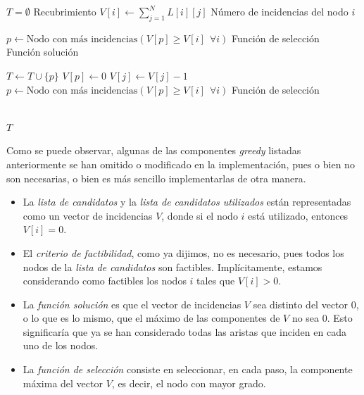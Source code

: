 \documentclass[11pt]{article}
\begin{document}
\begin{algorithm}
\begin{algorithmic}


    \State $T = \emptyset$ \Comment Recubrimiento
        \State $\displaystyle V[i] \gets \sum_{j=1}^N L[i][j]$ \Comment Número de incidencias del nodo $i$
    \EndFor

    \State $p \gets \text{Nodo con más incidencias} \left( V[p] \ge V[i] \ \ \forall i \right)$ \Comment Función de selección \\

     \Comment Función solución

        \State $T \gets T \cup \{p\}$
        \State $V[p] \gets 0$
                \State $V[j] \gets V[j]-1$
            \EndIf
        \EndFor
        \State $p \gets \text{Nodo con más incidencias} \left( V[p] \ge V[i] \ \ \forall i \right)$ \Comment Función de selección

    \EndWhile \\
    \State \Return $T$
\EndFunction
\end{algorithmic}
\end{algorithm}

Como se puede observar, algunas de las componentes \textit{greedy} listadas anteriormente se han omitido o modificado en la implementación, pues o bien no son necesarias, o bien es más sencillo implementarlas de otra manera.

\begin{itemize}
	\item La \textit{lista de candidatos} y la \textit{lista de candidatos utilizados} están representadas como un vector de incidencias $V$, donde si el nodo $i$ está utilizado, entonces $V[i] = 0$.
	\item El \textit{criterio de factibilidad}, como ya dijimos, no es necesario, pues todos los nodos de la \textit{lista de candidatos} son factibles. Implícitamente, estamos considerando como factibles los nodos $i$ tales que $V[i] > 0$.
	\item La \textit{función solución} es que el vector de incidencias $V$ sea distinto del vector $0$, o lo que es lo mismo, que el máximo de las componentes de $V$ no sea $0$. Esto significaría que ya se han considerado todas las aristas que inciden en cada uno de los nodos.
	\item La \textit{función de selección} consiste en seleccionar, en cada paso, la componente máxima del vector $V$, es decir, el nodo con mayor grado.
\end{itemize}
\end{document}
